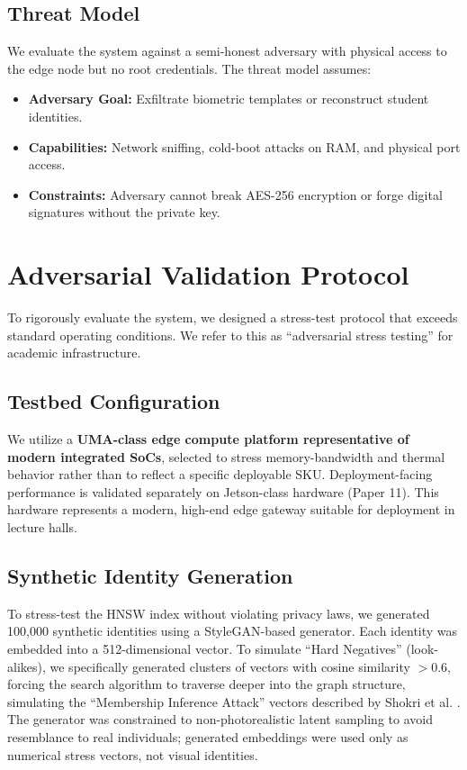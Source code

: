 \documentclass[conference]{IEEEtran}
\begin{document}
\subsection{Threat Model}
We evaluate the system against a semi-honest adversary with physical access to the edge node but no root credentials. The threat model assumes:
\begin{itemize}
    \item \textbf{Adversary Goal:} Exfiltrate biometric templates or reconstruct student identities.
    \item \textbf{Capabilities:} Network sniffing, cold-boot attacks on RAM, and physical port access.
    \item \textbf{Constraints:} Adversary cannot break AES-256 encryption or forge digital signatures without the private key.
\end{itemize}

\section{Adversarial Validation Protocol}
To rigorously evaluate the system, we designed a stress-test protocol that exceeds standard operating conditions. We refer to this as ``adversarial stress testing'' for academic infrastructure.

\subsection{Testbed Configuration}
We utilize a \textbf{UMA-class edge compute platform representative of modern integrated SoCs}, selected to stress memory-bandwidth and thermal behavior rather than to reflect a specific deployable SKU. Deployment-facing performance is validated separately on Jetson-class hardware (Paper 11). This hardware represents a modern, high-end edge gateway suitable for deployment in lecture halls.

\subsection{Synthetic Identity Generation}
To stress-test the HNSW index without violating privacy laws, we generated 100,000 synthetic identities using a StyleGAN-based generator. Each identity was embedded into a 512-dimensional vector. To simulate ``Hard Negatives'' (look-alikes), we specifically generated clusters of vectors with cosine similarity $>0.6$, forcing the search algorithm to traverse deeper into the graph structure, simulating the ``Membership Inference Attack'' vectors described by Shokri et al. \cite{b8}. The generator was constrained to non-photorealistic latent sampling to avoid resemblance to real individuals; generated embeddings were used only as numerical stress vectors, not visual identities.
\end{document}
